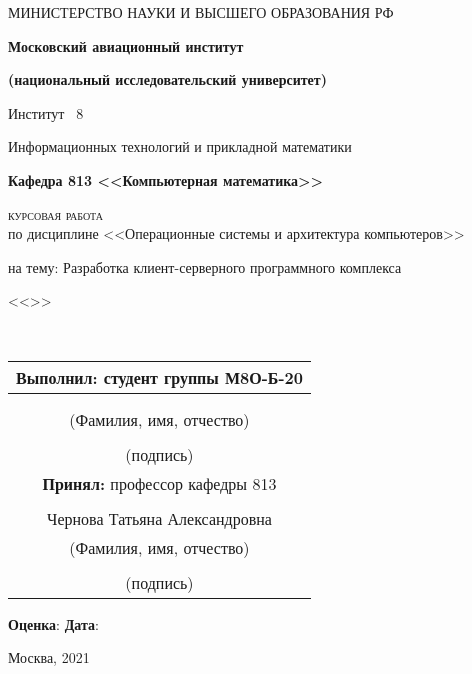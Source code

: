 \begin{center}
{\large	МИНИСТЕРСТВО НАУКИ И ВЫСШЕГО ОБРАЗОВАНИЯ РФ 
	
	\textbf{Московский авиационный институт }
	
	\textbf{(национальный исследовательский университет)} 
	\bigskip
	
	Институт \textnumero~8 
	
	Информационных технологий и прикладной математики}
	
	\bigskip
	
	\textbf{Кафедра 813 <<Компьютерная математика>>}
	\bigskip
	
	\vfill \textsc{\Large курсовая работа} \\
	{\large по дисциплине <<Операционные системы и архитектура компьютеров>>}
	\bigskip

	на тему: Разработка клиент-серверного программного комплекса
	
	<<\SOFTWARE>>
\end{center}
\vspace*{1.5cm}

\hfill 
\begin{minipage}{.6\linewidth}\
\begin{tabular}{c}
\textbf{Выполнил:} студент группы М8О-\GROUP{}Б-20 \\\hline \\[.3cm]
{\large \FIO} \\ \hline \scriptsize{(Фамилия, имя, отчество)}
\\[.3cm] \\ \hline
\scriptsize{(подпись)} \\[.3cm]
\textbf{Принял: }\hfill профессор кафедры 813 \\\hline 
\\[.3cm]

Чернова Татьяна Александровна\\\hline 
\scriptsize{(Фамилия, имя, отчество)}
\\[.3cm] \\ \hline
\scriptsize{(подпись)} 
\end{tabular}
\vspace*{1cm}
\end{minipage}		

\centerline{\textbf{Оценка}: \hspace*{8cm} \textbf{Дата}: \hspace*{2cm}}
\vspace*{1cm}

\centerline{Москва, 2021}
